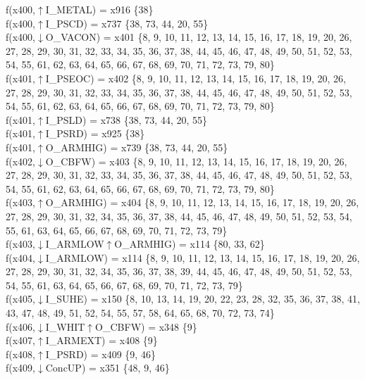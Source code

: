 f(x400,$\uparrow$I\_METAL) = x916 \{38\} \\  
f(x400,$\uparrow$I\_PSCD) = x737 \{38, 73, 44, 20, 55\} \\  
f(x400,$\downarrow$O\_VACON) = x401 \{8, 9, 10, 11, 12, 13, 14, 15, 16, 17, 18, 19, 20, 26, 27, 28, 29, 30, 31, 32, 33, 34, 35, 36, 37, 38, 44, 45, 46, 47, 48, 49, 50, 51, 52, 53, 54, 55, 61, 62, 63, 64, 65, 66, 67, 68, 69, 70, 71, 72, 73, 79, 80\} \\  
f(x401,$\uparrow$I\_PSEOC) = x402 \{8, 9, 10, 11, 12, 13, 14, 15, 16, 17, 18, 19, 20, 26, 27, 28, 29, 30, 31, 32, 33, 34, 35, 36, 37, 38, 44, 45, 46, 47, 48, 49, 50, 51, 52, 53, 54, 55, 61, 62, 63, 64, 65, 66, 67, 68, 69, 70, 71, 72, 73, 79, 80\} \\  
f(x401,$\uparrow$I\_PSLD) = x738 \{38, 73, 44, 20, 55\} \\  
f(x401,$\uparrow$I\_PSRD) = x925 \{38\} \\  
f(x401,$\uparrow$O\_ARMHIG) = x739 \{38, 73, 44, 20, 55\} \\  
f(x402,$\downarrow$O\_CBFW) = x403 \{8, 9, 10, 11, 12, 13, 14, 15, 16, 17, 18, 19, 20, 26, 27, 28, 29, 30, 31, 32, 33, 34, 35, 36, 37, 38, 44, 45, 46, 47, 48, 49, 50, 51, 52, 53, 54, 55, 61, 62, 63, 64, 65, 66, 67, 68, 69, 70, 71, 72, 73, 79, 80\} \\  
f(x403,$\uparrow$O\_ARMHIG) = x404 \{8, 9, 10, 11, 12, 13, 14, 15, 16, 17, 18, 19, 20, 26, 27, 28, 29, 30, 31, 32, 34, 35, 36, 37, 38, 44, 45, 46, 47, 48, 49, 50, 51, 52, 53, 54, 55, 61, 63, 64, 65, 66, 67, 68, 69, 70, 71, 72, 73, 79\} \\  
f(x403,$\downarrow$I\_ARMLOW$\uparrow$O\_ARMHIG) = x114 \{80, 33, 62\} \\  
f(x404,$\downarrow$I\_ARMLOW) = x114 \{8, 9, 10, 11, 12, 13, 14, 15, 16, 17, 18, 19, 20, 26, 27, 28, 29, 30, 31, 32, 34, 35, 36, 37, 38, 39, 44, 45, 46, 47, 48, 49, 50, 51, 52, 53, 54, 55, 61, 63, 64, 65, 66, 67, 68, 69, 70, 71, 72, 73, 79\} \\  
f(x405,$\downarrow$I\_SUHE) = x150 \{8, 10, 13, 14, 19, 20, 22, 23, 28, 32, 35, 36, 37, 38, 41, 43, 47, 48, 49, 51, 52, 54, 55, 57, 58, 64, 65, 68, 70, 72, 73, 74\} \\  
f(x406,$\downarrow$I\_WHIT$\uparrow$O\_CBFW) = x348 \{9\} \\  
f(x407,$\uparrow$I\_ARMEXT) = x408 \{9\} \\  
f(x408,$\uparrow$I\_PSRD) = x409 \{9, 46\} \\  
f(x409,$\downarrow$ConcUP) = x351 \{48, 9, 46\} \\  
